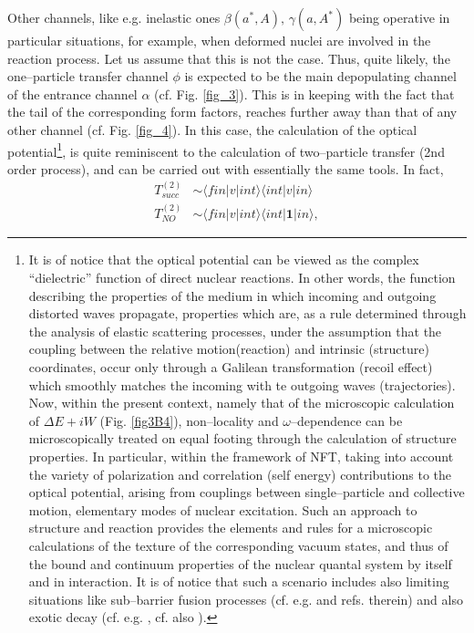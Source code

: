 Other channels, like e.g. inelastic ones $\beta(a^*,A),\,\gamma(a,A^*)$ being operative in particular situations, for example, when deformed nuclei are involved in the reaction process. Let us assume that this is not the case. Thus, quite likely, the one--particle transfer channel $\phi$ is expected to be the main depopulating channel of the entrance channel $\alpha$ (cf. Fig. \ref{fig_3}). This is  in keeping with the fact that the tail of the corresponding form factors, reaches further away than that of any other channel (cf. Fig. \ref{fig_4}). In this case, the calculation of the optical potential\footnote{It is of notice that the optical potential can be viewed as the complex ``dielectric'' function of direct nuclear reactions. In other words, the function describing the properties of the medium  in which incoming and outgoing distorted waves propagate, properties which are, as a rule determined through the analysis of elastic scattering processes, under the assumption that the coupling between the relative motion(reaction) and intrinsic (structure) coordinates, occur only  through a Galilean transformation (recoil effect) which smoothly matches the incoming with te outgoing waves (trajectories). Now, within the present context, namely that of the microscopic calculation of $\Delta E+iW$ (Fig. \ref{fig3B4}), non--locality and $\omega$--dependence can be microscopically treated on equal footing through the calculation of structure properties. In particular, within the framework of NFT, taking into account the variety of polarization and correlation (self energy) contributions to the optical potential, arising from  couplings between single--particle and collective motion, elementary modes of nuclear excitation. Such an approach to structure and reaction provides the elements and rules for  a microscopic calculations of the texture of the corresponding vacuum states, and thus of the bound and continuum properties of the nuclear quantal system by itself and in interaction. It is of notice that such a scenario includes also limiting situations like sub--barrier fusion processes (cf. e.g. \cite{Sargsyan:13} and refs. therein) and also exotic decay (cf. e.g. \cite{Barranco:88,Barranco:90,Montanari:14},  cf. also \cite{Brink:05}).}, is quite reminiscent to the calculation of two--particle transfer (2nd order process), and can be carried out with essentially the same tools. In fact,
\begin{equation}
\begin{split}
T^{(2)}_{succ}&\sim \langle fin|v|int\rangle\langle int |v|in\rangle\\
T^{(2)}_{NO}&\sim \langle fin|v|int\rangle\langle int |\mathbf{1}|in\rangle,
\end{split}
\end{equation}
